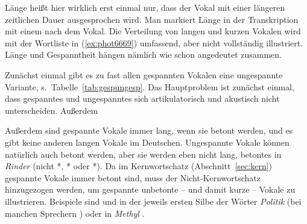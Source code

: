 
Länge heißt hier wirklich erst einmal nur, dass der Vokal mit einer längeren zeitlichen Dauer ausgesprochen wird.
Man markiert Länge in der Transkription mit einem \textipa{[:]} nach dem Vokal.
Die Verteilung von langen und kurzen Vokalen wird mit der Wortliste in (\ref{ex:phot6669}) umfassend, aber nicht vollständig illustriert.
Länge und Gespanntheit hängen nämlich wie schon angedeutet zusammen.

Zunächst einmal gibt es zu fast allen gespannten Vokalen eine ungespannte Variante, s.\ Tabelle~\ref{tab:gespungesp}.
Das Hauptproblem ist zunächst einmal, dass gespanntes und ungespanntes \textipa{[a]} sich artikulatorisch und akustisch nicht unterscheiden.
Außerdem 

Außerdem sind gespannte Vokale immer lang, wenn sie betont werden, und es gibt keine anderen langen Vokale im Deutschen.
Ungespannte Vokale können natürlich auch betont werden, aber sie werden eben nicht lang, \zB betontes \textipa{[I]} in \textit{Rinder} \textipa{[KInd5]} (nicht *\textipa{[kI:nd5]}, *\textipa{[kind5]} oder *\textipa{[ki:nd5]}).
Da im Kernwortschatz (Abschnitt~\ref{sec:kern}) gespannte Vokale immer betont sind, muss der Nicht-Kernwortschatz hinzugezogen werden, um gespannte unbetonte -- und damit kurze -- Vokale zu illustrieren.
Beispiele sind \textipa{[o]} und \textipa{[i]} in der jeweils ersten Silbe der Wörter \textit{Politik} \textipa{[politIk]} (bei manchen Sprechern \textipa{[politi:k]}) oder \textipa{[e]} in \textit{Methyl} \textipa{[mety:l]}.

